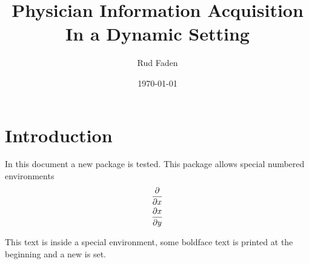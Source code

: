 \documentclass{article}
\title{Physician Information Acquisition In a Dynamic Setting}
\author{Rud Faden}
\date{\today} %
\begin{document}
\maketitle

\section{Introduction}
In this document a new package is tested. This package allows special numbered environments \cite{Acton1975}
\begin{align}
    \pder{x} \\
    \pder{x}{y}
\end{align}


\begin{example}
This text is inside a special environment, some boldface text is printed
at the beginning and a new  is set.
\end{example}

\printbibliography
\printindex
\end{document}
